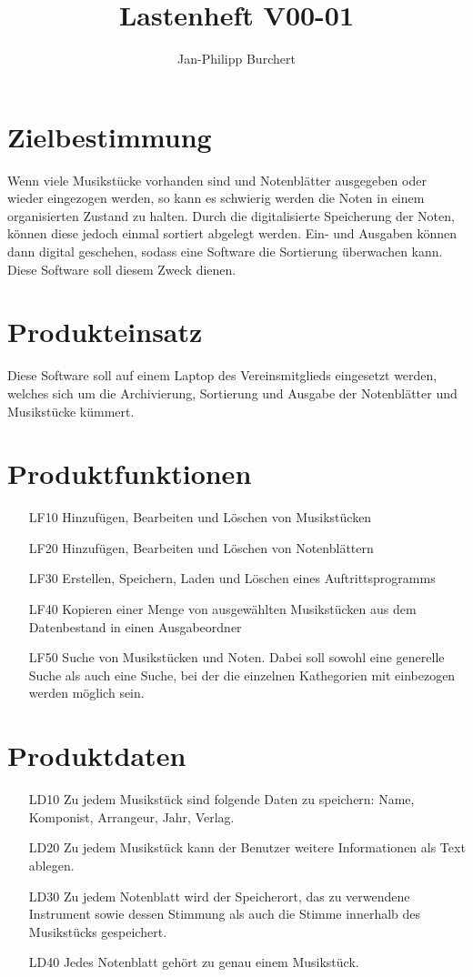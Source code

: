 \documentclass[a4paper,10pt]{scrartcl}
\title{Lastenheft V00-01}
\author{Jan-Philipp Burchert}
\date{ }
\begin{document}
\maketitle

 
\tableofcontents
\newpage

\section{Zielbestimmung}
Wenn viele Musikstücke vorhanden sind und Notenblätter ausgegeben oder wieder eingezogen werden, so kann es schwierig werden die Noten in einem organisierten Zustand zu halten. Durch die digitalisierte Speicherung der Noten, können diese jedoch einmal sortiert abgelegt werden. Ein- und Ausgaben können dann digital geschehen, sodass eine Software die Sortierung überwachen kann. Diese Software soll diesem Zweck dienen.
\section{Produkteinsatz}
Diese Software soll auf einem Laptop des Vereinsmitglieds eingesetzt werden, welches sich um die Archivierung, Sortierung und Ausgabe der Notenblätter und Musikstücke kümmert.
\section{Produktfunktionen}
\begin{enumerate}
\item[LF10] Hinzufügen, Bearbeiten und Löschen von Musikstücken
\item[LF20] Hinzufügen, Bearbeiten und Löschen von Notenblättern
\item[LF30] Erstellen, Speichern, Laden und Löschen eines Auftrittsprogramms
\item[LF40] Kopieren einer Menge von ausgewählten Musikstücken aus dem Datenbestand in einen Ausgabeordner
\item[LF50] Suche von Musikstücken und Noten. Dabei soll sowohl eine generelle Suche als auch eine Suche, bei der die einzelnen Kathegorien mit einbezogen werden möglich sein.
\end{enumerate}

\section{Produktdaten}
\begin{enumerate}
	\item[LD10] Zu jedem Musikstück sind folgende Daten zu speichern: Name, Komponist, Arrangeur, Jahr, Verlag.
	\item[LD20] Zu jedem Musikstück kann der Benutzer weitere Informationen als Text ablegen.
	\item[LD30] Zu jedem Notenblatt wird der Speicherort, das zu verwendene Instrument sowie dessen Stimmung als auch die Stimme innerhalb des Musikstücks gespeichert.
	\item[LD40] Jedes Notenblatt gehört zu genau einem Musikstück.
\end{enumerate}
\end{document}
